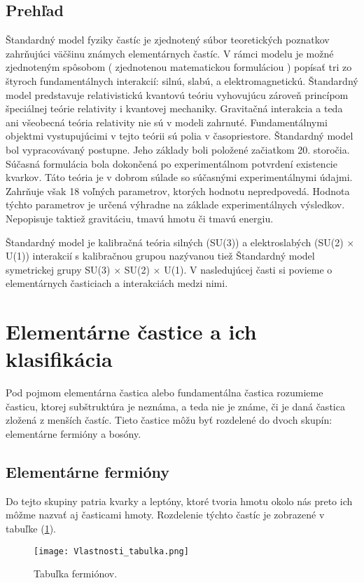 \documentclass[../../main.tex]{subfiles}
\begin{document}
\subsection{Prehľad}
Štandardný model fyziky častíc je zjednotený súbor teoretických poznatkov zahrňujúci väčšinu známych elementárnych častíc. V rámci modelu je možné zjednoteným spôsobom ( zjednotenou matematickou formuláciou ) popísať tri zo štyroch fundamentálnych interakcií: silnú, slabú, a elektromagnetickú. Štandardný model predstavuje relativistickú kvantovú teóriu vyhovujúcu zároveň princípom špeciálnej teórie relativity i kvantovej mechaniky. Gravitačná interakcia a teda ani všeobecná teória relativity nie sú v modeli zahrnuté. Fundamentálnymi objektmi vystupujúcimi v tejto teórii sú polia v časopriestore. Štandardný model bol vypracovávaný postupne. Jeho základy boli položené začiatkom 20. storočia. Súčasná formulácia bola dokončená po experimentálnom potvrdení existencie kvarkov. Táto teória je v dobrom súlade so súčasnými experimentálnymi údajmi. Zahrňuje však 18 voľných parametrov, ktorých hodnotu nepredpovedá. Hodnota týchto parametrov je určená výhradne na základe experimentálnych výsledkov. Nepopisuje taktiež gravitáciu, tmavú hmotu či tmavú energiu.
 
Štandardný model je kalibračná teória silných (SU(3)) a elektroslabých (SU(2) $\times$ U(1)) interakcií s kalibračnou grupou nazývanou tiež Štandardný model symetrickej grupy SU(3) $\times$ SU(2) $\times$ U(1). V nasledujúcej časti si povieme o elementárnych časticiach a interakciách medzi nimi.

\section{Elementárne častice a ich klasifikácia} 
Pod pojmom elementárna častica alebo fundamentálna častica rozumieme časticu, ktorej subštruktúra je neznáma, a teda nie je známe, či je daná častica zložená z  menších častíc. Tieto častice môžu byť rozdelené do dvoch skupín: elementárne fermióny a bosóny.
\subsection{Elementárne fermióny} 
Do tejto skupiny patria kvarky a leptóny, ktoré tvoria hmotu okolo nás preto ich môžme nazvať aj časticami hmoty. Rozdelenie týchto častíc je zobrazené v tabuľke (\ref{sf1:fig:Tabulka_fermionov}).
\begin{figure}[!h]
\texttt{[image: Vlastnosti\_tabulka.png]}
\caption{Tabuľka fermiónov.}
\label{sf1:fig:Tabulka_fermionov}
\end{figure}
\end{document}
